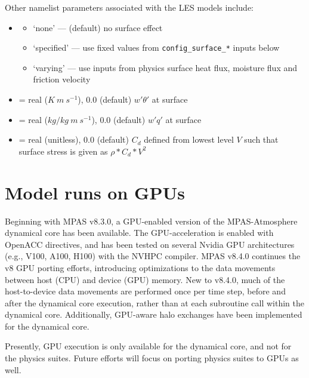 Other namelist parameters associated with the LES models include:

\begin{itemize}
\item {}
\begin{itemize}
    \item `none' --- (default) no surface effect
    \item `specified' --- use fixed values from {\tt config\_surface\_*} inputs below
    \item `varying' --- use inputs from physics surface heat flux, moisture flux and friction velocity
\end{itemize}
\item {} = real ($K~m~s^{-1}$), 0.0 (default) \newline
$w'\theta'$ at surface
\item {} = real ($kg/kg~m~s^{-1}$), 0.0 (default) \newline
$w'q'$ at surface
\item {} = real (unitless), 0.0 (default) \newline
$C_d$ defined from lowest level $V$ such that surface stress is given as $\rho * C_d * V^2$
\end{itemize}


\section{Model runs on GPUs}
\label{sec:gpu_runs}

Beginning with MPAS v8.3.0, a GPU-enabled version of the MPAS-Atmosphere dynamical core has been available. 
The GPU-acceleration is enabled with OpenACC directives, and has been tested on several Nvidia GPU architectures 
(e.g., V100, A100, H100) with the NVHPC compiler. MPAS v8.4.0 continues the v8 GPU porting efforts, introducing optimizations to the
data movements between host (CPU) and device (GPU) memory. New to v8.4.0, much of the host-to-device data movements are performed once
per time step, before and after the dynamical core execution, rather than at each subroutine call within the dynamical core. Additionally,
GPU-aware halo exchanges have been implemented for the dynamical core. 

Presently, GPU execution is only available for the dynamical core, and not for the physics suites. Future efforts will focus on porting physics suites to GPUs as well.

